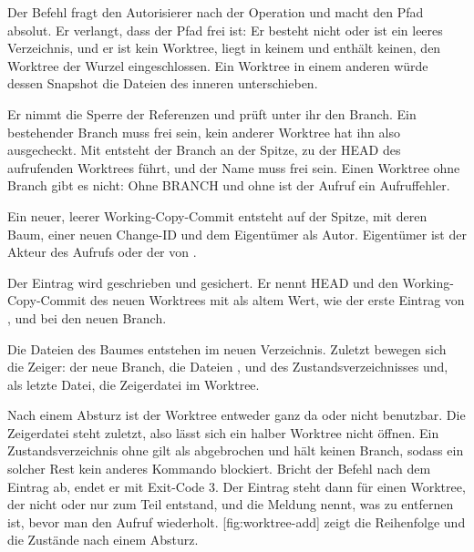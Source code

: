 \startitemize[n]
\item Der Befehl fragt den Autorisierer nach der Operation  und macht den Pfad
absolut. Er verlangt, dass der Pfad frei ist: Er besteht nicht oder ist ein leeres Verzeichnis,
und er ist kein Worktree, liegt in keinem und enthält keinen, den Worktree der Wurzel
eingeschlossen. Ein Worktree in einem anderen würde dessen Snapshot die Dateien des inneren
unterschieben.
\item Er nimmt die Sperre der Referenzen und prüft unter ihr den Branch.
Ein bestehender Branch muss frei sein, kein anderer Worktree hat ihn also ausgecheckt.
Mit  entsteht der Branch an der Spitze, zu der HEAD des aufrufenden Worktrees führt,
und der Name muss frei sein. Einen Worktree ohne Branch gibt es nicht:
Ohne BRANCH und ohne  ist der Aufruf ein Aufruffehler.
\item Ein neuer, leerer Working-Copy-Commit entsteht auf der Spitze, mit deren Baum, einer neuen
Change-ID und dem Eigentümer als Autor. Eigentümer ist der Akteur des Aufrufs oder der von
.
\item Der Eintrag  wird geschrieben und gesichert. Er nennt HEAD und den
Working-Copy-Commit des neuen Worktrees mit \type{-} als altem Wert, wie der erste Eintrag von
, und bei  den neuen Branch.
\item Die Dateien des Baumes entstehen im neuen Verzeichnis. Zuletzt bewegen sich die Zeiger:
der neue Branch, die Dateien ,  und  des
Zustandsverzeichnisses und, als letzte Datei, die Zeigerdatei  im Worktree.
\stopitemize

Nach einem Absturz ist der Worktree entweder ganz da oder nicht benutzbar.
Die Zeigerdatei steht zuletzt, also lässt sich ein halber Worktree nicht öffnen.
Ein Zustandsverzeichnis ohne  gilt als abgebrochen und hält keinen Branch,
sodass ein solcher Rest kein anderes Kommando blockiert.
Bricht der Befehl nach dem Eintrag ab, endet er mit Exit-Code 3.
Der Eintrag steht dann für einen Worktree, der nicht oder nur zum Teil entstand,
und die Meldung nennt, was zu entfernen ist, bevor man den Aufruf wiederholt.
[fig:worktree-add] zeigt die Reihenfolge und die Zustände nach einem Absturz.

\startplacefigure[title={Reihenfolge von \type{worktree add}, mit den Zuständen
    nach einem Absturz},
    reference=fig:worktree-add,location=here]
\stopplacefigure

